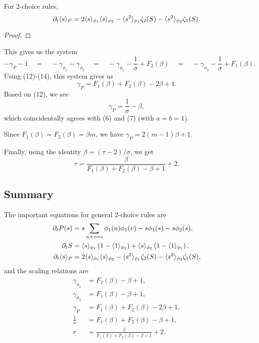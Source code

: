 \documentclass[twoside,10pt]{article}
\begin{document}
\begin{prop}
For 2-choice rules,
\[
	\partial_{t}{\langle s \rangle_{P}} = 2\langle s \rangle_{\phi_1}\langle s \rangle_{\phi_2} - \langle s^2 \rangle_{\phi_1}\zeta_2(S) - \langle s^2 \rangle_{\phi_2}\zeta_1(S).
\] 
\end{prop}
\begin{proof}
\end{proof}

This gives us the system
\[
	-\gamma_{P}-1 \quad=\quad -\gamma_{\phi_1}-\gamma_{\phi_2} \quad=\quad -\gamma_{\phi_1}-\frac{1}{\sigma} +F_2(\beta) \quad=\quad -\gamma_{\phi_2}-\frac{1}{\sigma} + F_1(\beta).
\] 
Using (12)-(14), this system gives us
\begin{equation}
	\gamma_{P} = F_1(\beta)+F_2(\beta) - 2\beta + 1.
\end{equation}
Based on (12), we see
\[
\gamma_{P} = \frac{1}{\sigma} -\beta,
\] which coincidentally agrees with (6) and (7) (with $a=b=1$).


\begin{ex}[da Costa]
	Since $F_1(\beta) = F_2(\beta) = \beta m$, we have $\gamma_{P}=2(m-1)\beta+1$.
\end{ex}

Finally, using the identity $\beta = (\tau-2)/\sigma$, we get
\begin{equation}
	\tau = \frac{\beta}{F_1(\beta)+F_2(\beta)-\beta+1} +2.
\end{equation}

\subsection{Summary}

The important equations for general 2-choice rules are
\begin{align*}
	\partial_{t}{P(s)} &= s \sum_{u+v=s} \phi_1(u) \phi_1(v) - s \phi_1(s) - s\phi_2(s),\\
	\partial_{t}{S} &= \langle s \rangle_{\phi_1}\left( 1-\langle 1 \rangle_{\phi_2} \right) + \langle s \rangle_{\phi_2}\left( 1-\langle 1 \rangle_{\phi_1} \right),\\
	\partial_{t}{\langle s \rangle_{P}} &= 2\langle s \rangle_{\phi_1}\langle s \rangle_{\phi_2} - \langle s^2 \rangle_{\phi_1}\zeta_2(S) - \langle s^2 \rangle_{\phi_2}\zeta_1(S),
\end{align*}
and the scaling relations are
\begin{align*}
	\gamma_{\phi_1} &= F_2(\beta) - \beta+1,\\
	\gamma_{\phi_2} &= F_1(\beta)-\beta+1,\\
	\gamma_{P} &= F_1(\beta) + F_2(\beta)-2\beta+1,\\
	\frac{1}{\sigma} &= F_1(\beta)+F_2(\beta)-\beta+1,\\
	\tau &= \frac{\beta}{F_1(\beta)+F_2(\beta)-\beta+1} +2.
\end{align*}
\end{document}
